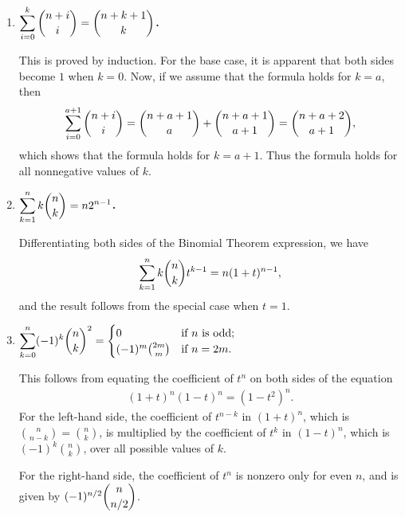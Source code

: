 \documentclass[a4paper,12pt]{article}
\begin{document}
\begin{enumerate}
\begin{enumerate}
            \item
                \boldmath
                \textbf{$\displaystyle\sum_{i = 0}^k \dbinom{n + i}{i} = \dbinom{n + k + 1}{k}$.} \par
                \unboldmath
                This is proved by induction. For the base case, it is apparent that both sides become $1$ when $k = 0$. Now, if we assume that the formula holds for $k = a$, then
                \begin{align*}
                    \sum_{i = 0}^{a + 1} \binom{n + i}{i} = \dbinom{n + a + 1}{a} + \dbinom{n + a + 1}{a + 1} = \dbinom{n + a + 2}{a + 1},
                \end{align*}
                which shows that the formula holds for $k = a + 1$. Thus the formula holds for all nonnegative values of $k$.

            \item
                \boldmath
                \textbf{$\displaystyle\sum_{k = 1}^n k \dbinom{n}{k} = n2^{n - 1}$.} \par
                \unboldmath
                Differentiating both sides of the Binomial Theorem expression, we have
                \begin{align*}
                    \sum_{k = 1}^n k \dbinom{n}{k} t^{k - 1} = n(1 + t)^{n - 1},
                \end{align*}
                and the result follows from the special case when $t = 1$.

            \item
                \boldmath
                \textbf{$\displaystyle\sum_{k = 0}^n (-1)^k \dbinom{n}{k}^2 = \begin{cases}
                    0 & \text{if } n \text{ is odd}; \\
                    (-1)^m \binom{2m}{m} & \text{if } n = 2m.
                \end{cases}$} \par
                \unboldmath
                This follows from equating the coefficient of $t^n$ on both sides of the equation
                \begin{align*}
                    (1 + t)^n (1 - t)^n = \left( 1 - t^2 \right)^n.
                \end{align*}
                For the left-hand side, the coefficient of $t^{n - k}$ in $(1 + t)^n$, which is $\binom{n}{n - k} = \binom{n}{k}$, is multiplied by the coefficient of $t^k$ in $(1 - t)^n$, which is $(-1)^k \binom{n}{k}$, over all possible values of $k$. \par
                For the right-hand side, the coefficient of $t^n$ is nonzero only for even $n$, and is given by $(-1)^{n/2} \dbinom{n}{n/2}$.
        \end{enumerate}


\end{enumerate}
\end{document}
